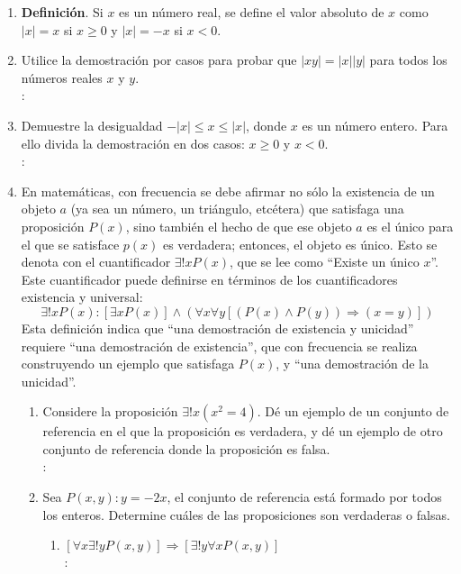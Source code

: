 \begin{enumerate}[label=0.1.\arabic*]
	\item \textbf{Definición}. Si $ x $ es un número real, se define el valor absoluto de $ x $ como $ |x| = x $ si $ x \geq 0 $ y $ |x| = -x $ si $ x < 0 $.
	
	\item Utilice la demostración por casos para probar que $ |xy| = |x||y| $ para todos los números reales $ x $ y $ y $. \\
	\solucion: \\
	
	\item Demuestre la desigualdad $ -|x| \leq x \leq |x| $, donde $ x $ es un número entero. Para ello divida la demostración en dos casos: $ x \geq 0 $ y $ x <0 $. \\
	\solucion: \\
	
	\item En matemáticas, con frecuencia se debe afirmar no sólo la existencia de un objeto $ a $ (ya sea un número, un triángulo, etcétera) que satisfaga una proposición $ P(x) $, sino también el hecho de que ese objeto $ a $ es el único para el que se satisface $ p(x) $ es verdadera; entonces, el objeto es único. Esto se denota con el cuantificador $ \exists ! x P(x) $, que se lee como ``Existe un único $ x $''. Este cuantificador puede definirse en términos de los cuantificadores existencia y universal:
	\[ \exists ! x P(x): [\exists x P(x)] \wedge (\forall x \forall y [(P(x) \wedge P(y)) \Rightarrow (x = y)]) \]
	Esta definición indica que ``una demostración de existencia y unicidad'' requiere ``una demostración  de existencia'', que con frecuencia se realiza construyendo un ejemplo que satisfaga $ P(x) $, y ``una demostración de la unicidad''.
	\begin{enumerate}[label=\arabic*)]
		\item Considere la proposición $ \exists ! x (x^2 = 4) $. Dé un ejemplo de un conjunto de referencia en el que la proposición es verdadera, y dé un ejemplo de otro conjunto de referencia donde la proposición es falsa. \\
		\solucion: \\
		
		\item Sea $ P(x,y): y = -2x $, el conjunto de referencia está formado por todos los enteros. Determine cuáles de las proposiciones son verdaderas o falsas.
		\begin{enumerate}[label=\roman*)]
			\item $ [\forall x \exists ! y P(x,y)] \Rightarrow [\exists ! y \forall x P(x,y)] $ \\
			\solucion: \\
			

\end{enumerate}
\end{enumerate}
\end{enumerate}
